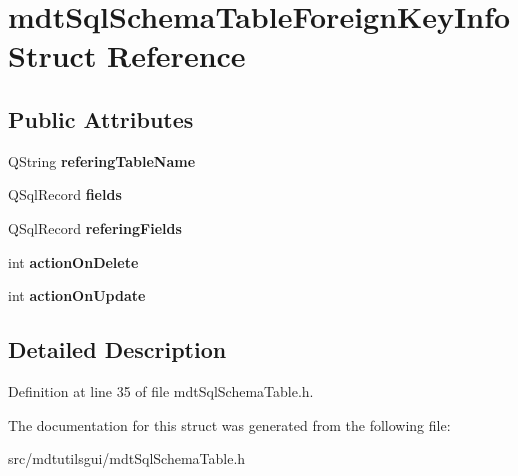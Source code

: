 \hypertarget{structmdt_sql_schema_table_foreign_key_info}{
\section{mdtSqlSchemaTableForeignKeyInfo Struct Reference}
\label{structmdt_sql_schema_table_foreign_key_info}
}
\subsection*{Public Attributes}
\begin{DoxyCompactItemize}
\item 
\hypertarget{structmdt_sql_schema_table_foreign_key_info_a67a54a858ca960ed0da71f734bb222b1}{
QString {\bfseries referingTableName}}
\label{structmdt_sql_schema_table_foreign_key_info_a67a54a858ca960ed0da71f734bb222b1}

\item 
\hypertarget{structmdt_sql_schema_table_foreign_key_info_a889196c9a4cb8c89722de9f03fa6daae}{
QSqlRecord {\bfseries fields}}
\label{structmdt_sql_schema_table_foreign_key_info_a889196c9a4cb8c89722de9f03fa6daae}

\item 
\hypertarget{structmdt_sql_schema_table_foreign_key_info_a23be89174f7131ce33047b11da180504}{
QSqlRecord {\bfseries referingFields}}
\label{structmdt_sql_schema_table_foreign_key_info_a23be89174f7131ce33047b11da180504}

\item 
\hypertarget{structmdt_sql_schema_table_foreign_key_info_a0c653ac4f2e5fdfe9dce56bfb4f09ee5}{
int {\bfseries actionOnDelete}}
\label{structmdt_sql_schema_table_foreign_key_info_a0c653ac4f2e5fdfe9dce56bfb4f09ee5}

\item 
\hypertarget{structmdt_sql_schema_table_foreign_key_info_ae43338084ff992252607f38078053475}{
int {\bfseries actionOnUpdate}}
\label{structmdt_sql_schema_table_foreign_key_info_ae43338084ff992252607f38078053475}

\end{DoxyCompactItemize}


\subsection{Detailed Description}


Definition at line 35 of file mdtSqlSchemaTable.h.



The documentation for this struct was generated from the following file:\begin{DoxyCompactItemize}
\item 
src/mdtutilsgui/mdtSqlSchemaTable.h\end{DoxyCompactItemize}
